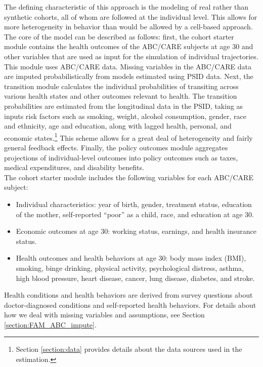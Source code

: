 \noindent The defining characteristic of this approach is the modeling of real rather than synthetic cohorts, all of whom
are followed at the individual level. This allows for more heterogeneity in behavior than would be allowed
by a cell-based approach. The core of the model can be described as follows: first, the cohort starter module contains the health outcomes of the ABC/CARE subjects at age 30 and other variables that are used as input for the simulation of individual trajectories. This module uses ABC/CARE data. Missing variables in the ABC/CARE data are imputed probabilistically from models estimated using PSID data.  Next, the transition module calculates the individual probabilities of transiting across various health states and other outcomes relevant to health. The transition probabilities are estimated from the longitudinal data in the PSID, taking as inputs risk factors such as smoking, weight, alcohol consumption, gender, race and ethnicity, age and education, along with lagged health, personal, and economic states.\footnote{Section \ref{section:data} provides details about the data sources used in the estimation.} This scheme allows for a great deal of heterogeneity and fairly general feedback effects. Finally, the policy outcomes module aggregates projections of individual-level outcomes into policy outcomes such as
taxes, medical expenditures, and disability benefits. \\


\noindent The cohort starter module includes the following variables for each ABC/CARE subject: \\
\begin{itemize}
\item Individual characteristics: year of birth, gender, treatment status, education of the mother, self-reported ``poor'' as a child, race, and education at age 30.
\item Economic outcomes at age 30: working status, earnings, and health insurance status.
\item Health outcomes and health behaviors at age 30: body mass index (BMI), smoking, binge drinking, physical activity, psychological distress, asthma, high blood pressure, heart disease, cancer, lung disease, diabetes, and stroke.
\end{itemize}
\noindent Health conditions and health behaviors are derived from survey questions about doctor-diagnosed conditions and self-reported health behaviors. For details about how we deal with missing variables and assumptions, see Section \ref{section:FAM_ABC_impute}. %
 \\

